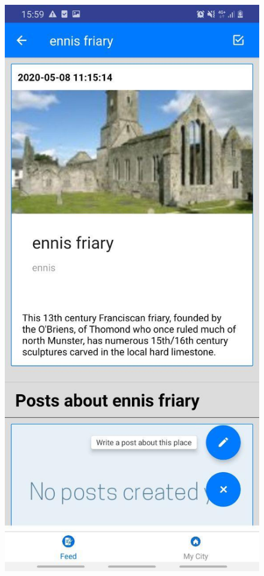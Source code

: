 
\begin{figure}[h!]
\begin{minipage}[t]{0.48\textwidth}
\includegraphics[width=\linewidth,keepaspectratio=true]{img/placeDetails.jpg}

\end{minipage}
\end{figure}
